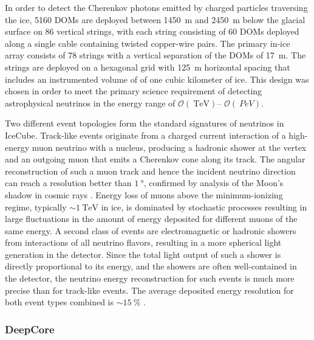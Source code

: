 In order to detect the Cherenkov photons emitted by charged particles
traversing the ice, \num{5160} DOMs are deployed between \SI{1450}{\meter}
and \SI{2450} {\meter} below the glacial surface on \num{86} vertical
strings, with each string consisting of \num{60} DOMs deployed along a single cable containing twisted copper-wire pairs. The
primary in-ice array consists of \num{78} strings with a vertical
separation of the DOMs of \SI{17}{\meter}.  The strings are
deployed on a hexagonal grid with \SI{125}{\meter} horizontal spacing
that includes an instrumented volume of of one cubic kilometer of ice.  This design was chosen in
order to meet the primary science requirement of detecting astrophysical
neutrinos in the energy range of $\mathcal{O}(\SI{}{\tera\electronvolt})$--
$\mathcal{O}(\SI{}{PeV})$.  %

Two different event topologies form the standard signatures of neutrinos in
IceCube.  Track-like events originate from a charged current interaction of
a high-energy muon neutrino with a nucleus, producing a hadronic shower at
the vertex and an outgoing muon that emits a Cherenkov cone along its
track.  The angular reconstruction of such a muon track and hence the
incident neutrino direction can reach a resolution better than
$\SI{1}{\degree}$, confirmed by analysis of the Moon's shadow
in cosmic rays \cite{IC3:moon}. Energy loss of muons above the minimum-ionizing regime, typically $ \sim
\SI{1}{\tera\electronvolt}$ in ice, is dominated by stochastic
processes resulting in large fluctuations in the amount of energy deposited
for different muons of the same energy.  A second class of events are
electromagnetic or hadronic showers from interactions of all neutrino
flavors, resulting in a more spherical light generation in the detector.
Since the total light output of such a shower is directly proportional to its energy, and
the showers are often well-contained in the detector, the neutrino energy
reconstruction for such events is much more precise than for track-like
events. The average deposited energy resolution for both event types
combined is $ \sim \SI{15}{\%}$ \cite{IC3:ereco}. 

\subsubsection{DeepCore}

